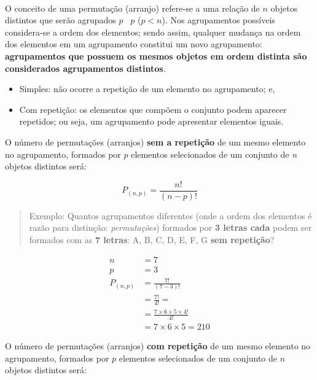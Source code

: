 \documentclass[
]{book}
\providecommand{\tightlist}{%
  \setlength{\itemsep}{0pt}\setlength{\parskip}{0pt}}
\begin{document}
~

O conceito de uma permutação (arranjo) refere-se a uma relação de \(n\) objetos distintos que serão agrupados \(p\) ~\(p\) (\(p < n\)). Nos agrupamentos possíveis considera-se a ordem dos elementos; sendo assim, qualquer mudança na ordem dos elementos em um agrupamento constitui um novo agrupamento: \textbf{agrupamentos que possuem os mesmos objetos em ordem distinta são considerados agrupamentos distintos}.

\hfill\break

\begin{itemize}
\tightlist
\item
  Simples: não ocorre a repetição de um elemento no agrupamento; e,\\
\item
  Com repetição: os elementos que compõem o conjunto podem aparecer repetidos; ou seja, um agrupamento pode apresentar elementos iguais.
\end{itemize}

\hfill\break

O número de permutações (arranjos) \textbf{sem a repetição} de um mesmo elemento no agrupamento, formados por \(p\) elementos selecionados de um conjunto de \emph{n} objetos distintos será:

\[
P_{(n,p)} =  \frac{n!}{(n-p)!}
\]

\hfill\break

\begin{quote}
Exemplo: Quantos agrupamentos diferentes (onde a ordem dos elementos é razão para distinção: \emph{permutações}) formados por \textbf{3 letras cada} podem ser formados com as \textbf{7 letras}: A, B, C, D, E, F, G \textbf{sem repetição}?
\end{quote}

\hfill\break

\begin{align*}
n  & = 7 \\
p  & = 3 \\
P_{(n,p)} & = \frac{7!}{ (7-3)!} \\
          & = \frac{7!}{4!} = \\
          & = \frac{ 7 \times 6 \times 5 \times 4! }{4!}  \\
          & = 7 \times 6 \times 5  = 210   
\end{align*}

\hfill\break

O número de permutações (arranjos) \textbf{com repetição} de um mesmo elemento no agrupamento, formados por \(p\) elementos selecionados de um conjunto de \(n\) objetos distintos será:
\end{document}
